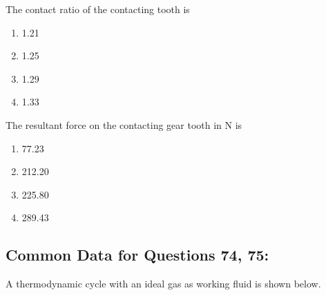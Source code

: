 \item The contact ratio of the contacting tooth is  
\begin{enumerate}
    \item 1.21
    \item 1.25
    \item 1.29
    \item 1.33
\end{enumerate}

\item The resultant force on the contacting gear tooth in N is  
\begin{enumerate}
    \item 77.23
    \item 212.20
    \item 225.80
    \item 289.43
\end{enumerate}

\subsection{Common Data for Questions 74, 75:}

A thermodynamic cycle with an ideal gas as working fluid is shown below.

